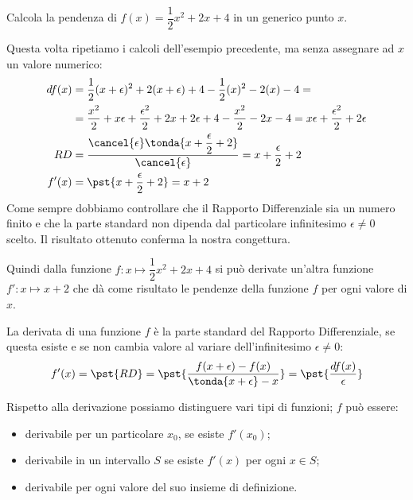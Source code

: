 \pagebreak %

\begin{esempio}
Calcola la pendenza di \(f(x)=\dfrac{1}{2}x^2+2x+4\) in un generico 
punto \(x\).

Questa volta ripetiamo i calcoli dell'esempio precedente, ma senza assegnare 
ad \(x\) un valore numerico:
\begin{align*}
df(x) &= \dfrac{1}{2}(x+\epsilon)^2+2(x +\epsilon)+4 -           
\dfrac{1}{2}(x)^2-2(x)-4 = \\
&= \dfrac{x^2}{2}+x\epsilon+\dfrac{\epsilon^2}{2} +
               2x+2\epsilon+4 - \dfrac{x^2}{2}-2x-4 = 
   x\epsilon+\dfrac{\epsilon^2}{2}+2\epsilon \\
RD &= \dfrac{\cancel{\epsilon} \tonda{x+\dfrac{\epsilon}{2}+2}}
            {\cancel{\epsilon}} = x+\dfrac{\epsilon}{2}+2\\
f'(x) &= \pst{x+\dfrac{\epsilon}{2}+2} = x +2
\end{align*}
Come sempre dobbiamo controllare che il Rapporto Differenziale sia 
un numero finito e che la parte standard non dipenda dal particolare 
infinitesimo \(\epsilon \ne 0\) scelto.
Il risultato ottenuto conferma la nostra congettura.
\end{esempio}

Quindi dalla funzione \(f: x \mapsto \dfrac{1}{2}x^2+2x+4\) 
si può derivate un'altra funzione \(f': x \mapsto x +2\) che dà come 
risultato le pendenze della funzione \(f\) per ogni valore di \(x\). 

\begin{definizione}
La derivata di una funzione \(f\) è la parte standard del Rapporto 
Differenziale, se questa esiste e se non cambia valore al variare 
dell'infinitesimo \(\epsilon \neq 0\):
\[f'(x) = \pst{RD} = 
  \pst{\dfrac{f(x +\epsilon) -f(x)}{\tonda{x +\epsilon} -x}}=
  \pst{\frac{df(x)}{\epsilon}}\]
\end{definizione}

Rispetto alla derivazione possiamo distinguere vari tipi di funzioni; 
\(f\) può essere:
\begin{itemize}[nosep]
\item derivabile per un particolare \(x_0\), se esiste \(f'(x_0)\);
\item derivabile in un intervallo \(S\) se esiste \(f'(x)\) per ogni 
\(x \in S\);
\item derivabile per ogni valore del suo insieme di definizione.
\end{itemize}

